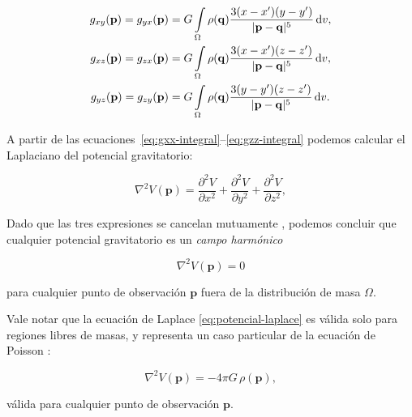 \begin{align}
    g_{xy}(\mathbf{p}) =
    g_{yx}(\mathbf{p}) &=
        G \int\limits_\Omega \rho(\mathbf{q})
        \frac{3(x - x')(y - y')}{|\mathbf{p} - \mathbf{q}|^5}
        \mathop{}\!\textnormal{d} v,
    \label{eq:gxy-integral}
    \\
    g_{xz}(\mathbf{p}) =
    g_{zx}(\mathbf{p}) &=
        G \int\limits_\Omega \rho(\mathbf{q})
        \frac{3(x - x')(z - z')}{|\mathbf{p} - \mathbf{q}|^5}
        \mathop{}\!\textnormal{d} v,
    \label{eq:gxz-integral}
    \\
    g_{yz}(\mathbf{p}) =
    g_{zy}(\mathbf{p}) &=
        G \int\limits_\Omega \rho(\mathbf{q})
        \frac{3(y - y')(z - z')}{|\mathbf{p} - \mathbf{q}|^5}
        \mathop{}\!\textnormal{d} v.
    \label{eq:gyz-integral}
\end{align}

A partir de las ecuaciones~\ref{eq:gxx-integral}--\ref{eq:gzz-integral} podemos
calcular el Laplaciano del potencial gravitatorio:

\begin{equation}
    \nabla^2 V(\mathbf{p}) =
        \frac{\partial^2 V}{\partial x^2}
        + \frac{\partial^2 V}{\partial y^2}
        + \frac{\partial^2 V}{\partial z^2},
\end{equation}

\noindent Dado que las tres expresiones se cancelan mutuamente
\citep{blakely1995}, podemos concluir que cualquier potencial gravitatorio es
un \emph{campo harmónico}

\begin{equation}
    \nabla^2 V(\mathbf{p}) = 0
    \label{eq:potencial-laplace}
\end{equation}

\noindent para cualquier punto de observación $\mathbf{p}$ fuera de la
distribución de masa $\Omega$.

Vale notar que la ecuación de Laplace \ref{eq:potencial-laplace} es válida
solo para regiones libres de masas, y representa un caso particular de la
ecuación de Poisson \citep{blakely1995}:

\begin{equation}
    \nabla^2 V(\mathbf{p}) = -4\pi G \, \rho(\mathbf{p}),
    \label{eq:potencial-poisson}
\end{equation}

\noindent válida para cualquier punto de observación $\mathbf{p}$.


